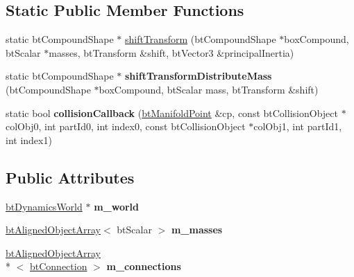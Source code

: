 \subsection*{Static Public Member Functions}
\begin{DoxyCompactItemize}
\item 
static bt\+Compound\+Shape $\ast$ \hyperlink{classbt_fracture_body_adf11a93222057986021f7f147371991e}{shift\+Transform} (bt\+Compound\+Shape $\ast$box\+Compound, bt\+Scalar $\ast$masses, bt\+Transform \&shift, bt\+Vector3 \&principal\+Inertia)
\item 
\hypertarget{classbt_fracture_body_a29c54368ef075a6eb8ea614fa95590d5}{static bt\+Compound\+Shape $\ast$ {\bfseries shift\+Transform\+Distribute\+Mass} (bt\+Compound\+Shape $\ast$box\+Compound, bt\+Scalar mass, bt\+Transform \&shift)}\label{classbt_fracture_body_a29c54368ef075a6eb8ea614fa95590d5}

\item 
\hypertarget{classbt_fracture_body_a5ef72e92752eece0a6791a04e3e2d6db}{static bool {\bfseries collision\+Callback} (\hyperlink{classbt_manifold_point}{bt\+Manifold\+Point} \&cp, const bt\+Collision\+Object $\ast$col\+Obj0, int part\+Id0, int index0, const bt\+Collision\+Object $\ast$col\+Obj1, int part\+Id1, int index1)}\label{classbt_fracture_body_a5ef72e92752eece0a6791a04e3e2d6db}

\end{DoxyCompactItemize}
\subsection*{Public Attributes}
\begin{DoxyCompactItemize}
\item 
\hypertarget{classbt_fracture_body_a9a7593439dec021509f9d4699c6e6dd3}{\hyperlink{classbt_dynamics_world}{bt\+Dynamics\+World} $\ast$ {\bfseries m\+\_\+world}}\label{classbt_fracture_body_a9a7593439dec021509f9d4699c6e6dd3}

\item 
\hypertarget{classbt_fracture_body_acf2c239684a3915a060b882b62e9d83f}{\hyperlink{classbt_aligned_object_array}{bt\+Aligned\+Object\+Array}$<$ bt\+Scalar $>$ {\bfseries m\+\_\+masses}}\label{classbt_fracture_body_acf2c239684a3915a060b882b62e9d83f}

\item 
\hypertarget{classbt_fracture_body_a056986119ab02401a43f47e0e49c568e}{\hyperlink{classbt_aligned_object_array}{bt\+Aligned\+Object\+Array}\\*
$<$ \hyperlink{structbt_connection}{bt\+Connection} $>$ {\bfseries m\+\_\+connections}}\label{classbt_fracture_body_a056986119ab02401a43f47e0e49c568e}

\end{DoxyCompactItemize}
